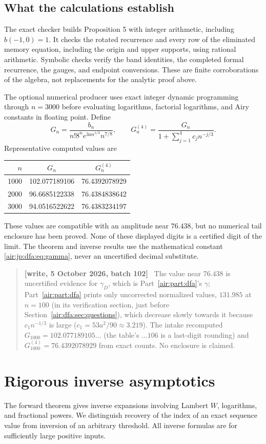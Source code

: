 \documentclass[11pt,letterpaper]{article}
\numberwithin{equation}{section}
\theoremstyle{remark}
\newenvironment{writenotejp}{\par\smallskip\begin{quote}\small\textbf{[write, 5 October 2026, batch 102]}\ }{\end{quote}\smallskip}
\begin{document}
\subsection{What the calculations establish}
The exact checker builds Proposition 5 with integer arithmetic, including $b(-1,0)=1$. It checks the rotated recurrence and every row of the eliminated memory equation, including the origin and upper supports, using rational arithmetic. Symbolic checks verify the band identities, the completed formal recurrence, the gauges, and endpoint conversions. These are finite corroborations of the algebra, not replacements for the analytic proof above.

The optional numerical producer uses exact integer dynamic programming through $n=3000$ before evaluating logarithms, factorial logarithms, and Airy constants in floating point. Define
\[
 G_n=\frac{b_n}{n!8^ne^{3an^{1/3}}n^{7/8}},\qquad
 G_n^{(4)}=\frac{G_n}{1+\sum_{j=1}^4c_jn^{-j/3}}.
\]
Representative computed values are
\begin{center}
\begin{tabular}{rcc}
\toprule
$n$&$G_n$&$G_n^{(4)}$\\
\midrule
1000&102.077189106&76.4392078929\\
2000&96.6685122338&76.4384838642\\
3000&94.0516522622&76.4383234197\\
\bottomrule
\end{tabular}
\end{center}
These values are compatible with an amplitude near $76.438$, but no numerical tail enclosure has been proved. None of these displayed digits is a certified digit of the limit. The theorem and inverse results use the mathematical constant \eqref{air:jp:dfa:eq:gamma}, never an uncertified decimal substitute.
\begin{writenotejp}
The value near $76.438$ is uncertified evidence for $\gamma_D$, which is Part~\ref{air:part:dfa}'s $\gamma$; Part~\ref{air:part:dfa} prints only uncorrected normalized values, $131.985$ at $n=100$ (in its verification section, just before Section~\ref{air:dfa:sec:questions}), which decrease slowly towards it because $c_1n^{-1/3}$ is large ($c_1=53a^2/90\approx3.219$). The intake recomputed $G_{1000}=102.077189105\ldots$ (the table's $\ldots106$ is a last-digit rounding) and $G^{(4)}_{1000}=76.4392078929$ from exact counts. No enclosure is claimed.
\end{writenotejp}

\section{Rigorous inverse asymptotics}\label{air:jp:dfa:sec:inverse}
The forward theorem gives inverse expansions involving Lambert $W$, logarithms, and fractional powers. We distinguish recovery of the index of an exact sequence value from inversion of an arbitrary threshold. All inverse formulas are for sufficiently large positive inputs.
\end{document}
